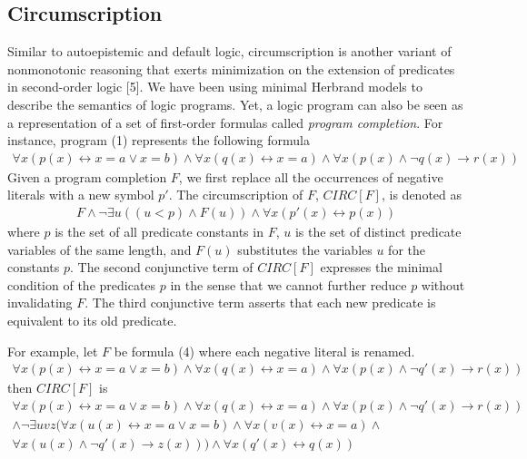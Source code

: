 \subsection{Circumscription}
Similar to autoepistemic and default logic, circumscription is another variant of 
nonmonotonic reasoning that exerts minimization on the extension of predicates in 
second-order logic [5]. We have been using minimal Herbrand models to describe the semantics 
of logic programs. Yet, a logic program can also be seen as a representation of a set of 
first-order formulas called \emph{program completion}. For instance, program (1) 
represents the following formula
\begin{align}
    \forall x (p(x) \leftrightarrow x = a \lor x = b) \land 
    \forall x (q(x) \leftrightarrow x = a) \land 
    \forall x (p(x) \land \neg q(x) \rightarrow r(x))
\end{align}
Given a program completion $F$, we first replace all the occurrences of negative literals 
with a new symbol $p'$. The circumscription of $F$, $CIRC[F]$, is denoted as 
\begin{align}
    F \land \neg \exists u((u < p) \land F(u)) \land \forall x (p'(x) \leftrightarrow p(x))
\end{align}
where $p$ is the set of all predicate constants in $F$, $u$ is the set of distinct 
predicate variables of the same length, and $F(u)$ substitutes the variables $u$ for 
the constants $p$. The second conjunctive term of $CIRC[F]$ expresses the minimal 
condition of the predicates $p$ in the sense that we cannot further reduce $p$ without 
invalidating $F$. The third conjunctive term asserts that each new predicate is 
equivalent to its old predicate.

For example, let $F$ be formula (4) where each negative literal is renamed.
\begin{align*}
    \forall x (p(x) \leftrightarrow x = a \lor x = b) \land 
    \forall x (q(x) \leftrightarrow x = a) \land 
    \forall x (p(x) \land \neg q'(x) \rightarrow r(x))
\end{align*}
then $CIRC[F]$ is 
\begin{multline*}
    \forall x (p(x) \leftrightarrow x = a \lor x = b) \land 
    \forall x (q(x) \leftrightarrow x = a) \land 
    \forall x (p(x) \land \neg q'(x) \rightarrow r(x)) \\ 
    \land \neg \exists uvz (
        \forall x (u(x) \leftrightarrow x = a \lor x = b) \land 
        \forall x (v(x) \leftrightarrow x = a) \land 
        \\ \forall x (u(x) \land \neg q'(x) \rightarrow z(x)) 
    ) 
    \land \forall x (q'(x) \leftrightarrow q(x))
\end{multline*}

